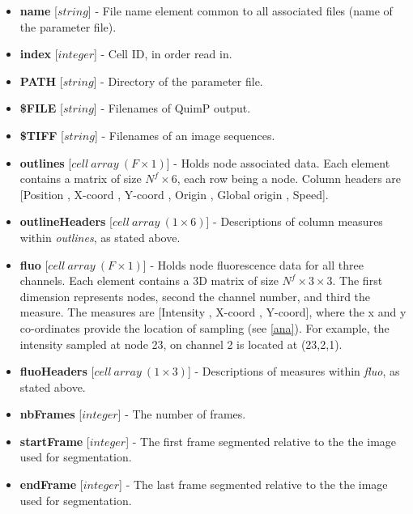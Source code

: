 \documentclass[a4paper,12pt]{article}
\begin{document}
\begin{itemize}

 \item \textbf{name} [$string$] - File name element common to all associated files (name of the parameter file).
 
  \item \textbf{index} [$integer$] - Cell ID, in order read in.
 
 \item \textbf{PATH} [$string$] - Directory of the parameter file.
 
 \item \textbf{\$FILE} [$string$] - Filenames of  QuimP output.
 
 \item \textbf{\$TIFF} [$string$] - Filenames of an image sequences.
 
  \item \textbf{outlines} [$cell~array~(F\times1)$]  - Holds node associated data. Each element
 contains a matrix of size $N^{f}\times6$,
each row being a node. Column headers are [Position , X-coord , Y-coord , Origin , Global origin ,  Speed].
 
 \item \textbf{outlineHeaders} [$cell~array~(1\times6)$] - Descriptions of column measures within \textit{outlines},
  as stated above.
  
 \item \textbf{fluo} [$cell~array~(F\times1)$] - Holds node fluorescence data for all three channels. Each element contains a 
  3D matrix of size $N^{f}\times3\times3$.  The first dimension represents nodes, second the channel number, and third the
  measure.   The measures are [Intensity , X-coord , Y-coord], where the x and y co-ordinates provide the location of
  sampling (see \autoref{ana}).  For example, the intensity sampled at node 23, on channel 2 is located at (23,2,1).
  
 \item \textbf{fluoHeaders} [$cell~array~(1\times3)$] - Descriptions of measures within \textit{fluo}, as 
 stated above.
 
 \item \textbf{nbFrames} [$integer$] - The number of frames.

 \item \textbf{startFrame} [$integer$] - The first frame segmented relative to the the image used for segmentation.

 \item \textbf{endFrame} [$integer$] - The last frame segmented relative to the the image used for segmentation.


\end{itemize}
\end{document}
